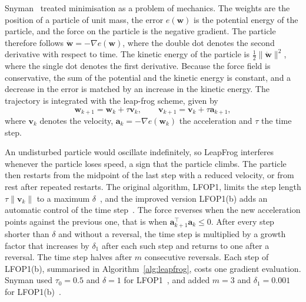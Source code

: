 \documentclass[conference]{IEEEtran}
\newcommand{\vect}[1]{\mathbf{#1}}
\begin{document}
Snyman~\cite{snyman1982} treated minimisation as a problem of mechanics. The
weights are the position of a particle of unit mass, the error $e(\vect{w})$ is the
potential energy of the particle, and the force on the particle is the negative
gradient. The particle therefore follows $\ddot{\vect{w}} = -\nabla e(\vect{w})$,
where the double dot denotes the second derivative with respect to time. The
kinetic energy of the particle is $\frac{1}{2} \lVert \dot{\vect{w}} \rVert^2$,
where the single dot denotes the first derivative. Because the force
field is conservative, the sum of the potential and the kinetic energy is constant,
and a decrease in the error is matched by an increase in the kinetic energy. The trajectory is integrated with the leap-frog scheme, given by
\begin{equation}
\vect{w}_{k+1} = \vect{w}_k + \tau \vect{v}_k, \qquad
\vect{v}_{k+1} = \vect{v}_k + \tau \vect{a}_{k+1},
\end{equation}
where $\vect{v}_k$ denotes the velocity, $\vect{a}_k = -\nabla e(\vect{w}_k)$ the
acceleration and $\tau$ the time step.

An undisturbed particle would oscillate indefinitely, so LeapFrog interferes
whenever the particle loses speed, a sign that the particle climbs. The particle then restarts from the midpoint of the last
step with a reduced velocity, or from rest after repeated restarts. The original
algorithm, LFOP1, limits the step length $\tau \lVert \vect{v}_k \rVert$ to a
maximum $\delta$~\cite{snyman1982}, and the improved version LFOP1(b) adds an
automatic control of the time step~\cite{snyman1983}. The force reverses when the new acceleration
points against the previous one, that is when
$\vect{a}_{k+1}^{\top} \vect{a}_k \le 0$. After every step shorter than
$\delta$ and without a reversal, the time step is multiplied by a growth factor that
increases by $\delta_1$ after each such step and returns to one after a reversal.
The time step halves after $m$ consecutive reversals. Each step of LFOP1(b),
summarised in Algorithm~\ref{alg:leapfrog}, costs one gradient evaluation. Snyman used $\tau_0 = 0.5$ and $\delta = 1$ for
LFOP1~\cite{snyman1982}, and added $m = 3$ and $\delta_1 = 0.001$ for
LFOP1(b)~\cite{snyman1983}.
\end{document}
